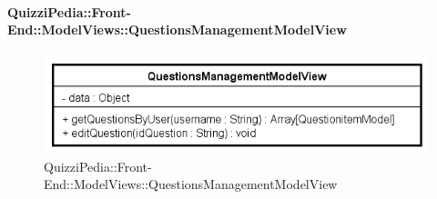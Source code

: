 \paragraph{QuizziPedia::Front-End::ModelViews::QuestionsManagementModelView}

\label{QuizziPedia::Front-End::ModelViews::QuestionsManagementModelView}

\begin{figure}[ht]
	\centering
	\includegraphics[scale=0.8,keepaspectratio]{UML/Classi/Front-End/QuizziPedia_Front-end_ModelView_QuestionsManagementModelView.png}
	\caption{QuizziPedia::Front-End::ModelViews::QuestionsManagementModelView}
\end{figure} \FloatBarrier

